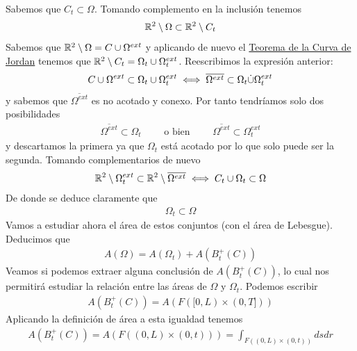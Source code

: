 \begin{ejercicio}
\begin{solucion}
        Sabemos que $C_t\subset \Omega$. Tomando complemento en la inclusión tenemos
        \begin{gather*}
            \mathbb{R}^2 \setminus \Omega \subset \mathbb{R}^2 \setminus C_t
        \end{gather*}
        Sabemos que $\mathbb{R}^2 \setminus \Omega = C\cup \Omega^{ext}$ y aplicando de nuevo el \hyperref[teo:clasif]{Teorema de la Curva de Jordan} tenemos que $\mathbb{R}^2 \setminus C_t = \Omega_t \cup \Omega_t^{ext}$. Reescribimos la expresión anterior:
        \begin{gather*}
            C\cup \Omega^{ext} \subset \Omega_t \cup \Omega_t^{ext} \iff \overline{\Omega^{ext}} \subset \Omega_t \dot{\cup} \Omega_t^{ext}
        \end{gather*}
        y sabemos que $\overline{\Omega^{ext}}$ es no acotado y conexo. Por tanto tendríamos solo dos posibilidades
        \begin{gather*}
            \overline{\Omega^{ext}} \subset \Omega_t \qquad \text{ o bien } \qquad \overline{\Omega^{ext}} \subset \Omega_t^{ext}
        \end{gather*}
        y descartamos la primera ya que $\Omega_t$ está acotado por lo que solo puede ser la segunda. Tomando complementarios de nuevo
        \begin{gather*}
            \mathbb{R}^2 \setminus \Omega_t^{ext} \subset \mathbb{R}^2 \setminus \overline{\Omega^{ext}} \iff C_t\cup \Omega_t \subset \Omega
        \end{gather*}
        De donde se deduce claramente que
        \begin{gather*}
            \Omega_t \subset \Omega
        \end{gather*} 
        Vamos a estudiar ahora el área de estos conjuntos (con el área de Lebesgue). Deducimos que 
        \begin{gather*}
            A(\Omega) = A(\Omega_t) + A(B_t^+(C))
        \end{gather*}
        Veamos si podemos extraer alguna conclusión de $A(B_t^+(C))$, lo cual nos permitirá estudiar la relación entre las áreas de $\Omega$ y $\Omega_t$. Podemos escribir
        \begin{gather*}
            A(B_t^+(C)) = A(F([0,L)\times (0,T]))
        \end{gather*}
        Aplicando la definición de área a esta igualdad tenemos
        \begin{gather*}
            A(B_t^+(C)) = A(F((0,L)\times (0,t))) = \int_{F((0,L)\times (0,t))} dsdr

\end{gather*}
\end{solucion}
\end{ejercicio}
